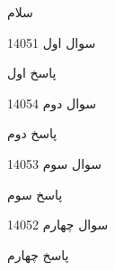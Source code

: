\documentclass[]{book}
\begin{document}
سلام

\begin{test}[4]{
    سوال اول
    }{1405}{1}
    \task{}
\end{test}

\begin{ans}
    پاسخ اول
\end{ans}



\begin{test}[4]{
        سوال دوم
    }{1405}{4}
    \task{}
\end{test}

\begin{ans}
    پاسخ دوم
\end{ans}





\begin{test}[4]{
        سوال سوم
    }{1405}{3}
    \task{}
\end{test}

\begin{ans}
    پاسخ سوم
\end{ans}





\begin{test}[4]{
        سوال چهارم
    }{1405}{2}
    \task{}
\end{test}

\begin{ans}
    پاسخ چهارم
\end{ans}


\AnswerKeyFull
\end{document}
